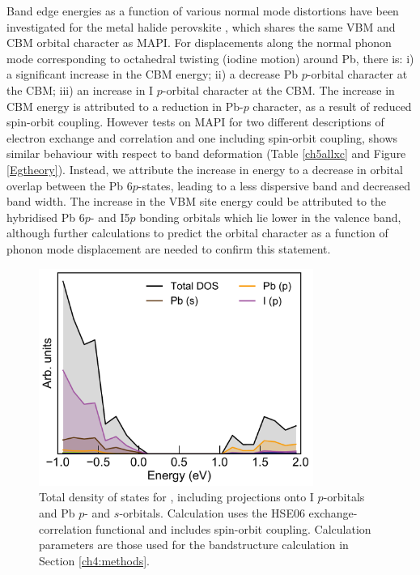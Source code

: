 Band edge energies as a function of various normal mode distortions have been investigated for the metal halide perovskite , which shares the same VBM and CBM orbital character as MAPI.\autocite{McKechnie2018} For displacements along the normal phonon mode corresponding to octahedral twisting (iodine motion) around Pb, there is: i) a significant increase in the CBM energy; ii) a decrease Pb $p$-orbital character at the CBM; iii) an increase in I $p$-orbital character at the CBM. The increase in CBM energy is attributed to a reduction in Pb-$p$ character, as a result of reduced spin-orbit coupling. However tests on MAPI for two different descriptions of electron exchange and correlation and one including spin-orbit coupling, shows similar behaviour with respect to band deformation (Table \ref{ch5allxc} and Figure \ref{Egtheory}). 
Instead, we attribute the increase in energy to a decrease in orbital overlap between the Pb 6$p$-states, leading to a less dispersive band and decreased band width.
The increase in the VBM site energy could be attributed to the hybridised Pb 6$p$- and I5$p$ bonding orbitals which lie lower in the valence band,\autocite{Wang2015i} although further calculations to predict the orbital character as a function of phonon mode displacement are needed to confirm this statement.

\begin{figure}[h] \centering
\includegraphics[width=0.8\textwidth]{figures/ch5/dos.pdf}
\caption[Total and projected density of states]{\label{ch5pdos}
Total density of states for , including projections onto I $p$-orbitals and Pb $p$- and $s$-orbitals. Calculation uses the HSE06 exchange-correlation functional and includes spin-orbit coupling. Calculation parameters are those used for the bandstructure calculation in Section \ref{ch4:methods}.
}
\end{figure}


